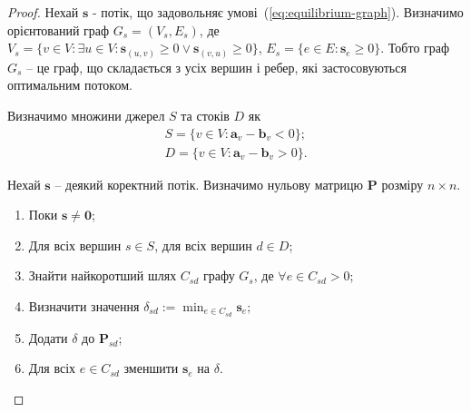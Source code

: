 \begin{proof}
    Нехай $\mathbf{s}$ - потік, що задовольняє умові~(\ref{eq:equilibrium-graph}). Визначимо орієнтований граф
    $G_s = (V_s, E_s)$, де $V_s = \{v \in V: \exists u \in V: \mathbf{s}_{(u, v)} \ge 0 \lor \mathbf{s}_{(v, u)} \ge 0\}$,
    $E_s = \{e \in E : \mathbf{s}_e \ge 0\}$.
    Тобто граф $G_s$ -- це граф, що складається з усіх вершин і ребер, які застосовуються оптимальним потоком.

    Визначимо множини джерел $S$ та стоків $D$ як
    \begin{eqnarray*}
        S = \{v \in V: \mathbf{a}_v - \mathbf{b}_v < 0\}; \\ 
        D = \{v \in V: \mathbf{a}_v - \mathbf{b}_v > 0\}.
    \end{eqnarray*}

    Нехай $\mathbf{s}$ -- деякий коректний потік. Визначимо нульову матрицю $\mathbf{P}$ розміру $n \times n$.
    \begin{enumerate}
        \item Поки $\mathbf{s} \neq \mathbf{0}$;
        \item Для всіх вершин $s \in S$, для всіх вершин $d \in D$;
        \item Знайти найкоротший шлях $C_{sd}$ графу $G_s$, де $\forall e \in C_{sd} > 0$;
        \item Визначити значення $\delta_{sd} := \min_{e \in C_{sd}} \mathbf{s}_e$;
        \item Додати $\delta$ до $\mathbf{P}_{sd}$;
        \item Для всіх $e \in C_{sd}$ зменшити $\mathbf{s}_e$ на $\delta$.
    \end{enumerate}


\end{proof}
